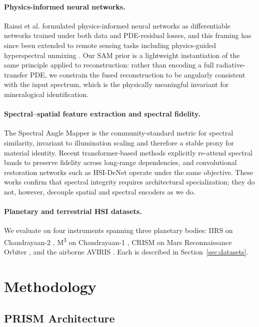 \documentclass{article} %
\begin{document}
\paragraph{Physics-informed neural networks.} Raissi et al. \citep{raissi2019pinn} formulated physics-informed neural networks as differentiable networks trained under both data and PDE-residual losses, and this framing has since been extended to remote sensing tasks including physics-guided hyperspectral unmixing \citep{lin2026hapke}. Our SAM prior is a lightweight instantiation of the same principle applied to reconstruction: rather than encoding a full radiative-transfer PDE, we constrain the fused reconstruction to be angularly consistent with the input spectrum, which is the physically meaningful invariant for mineralogical identification.

\paragraph{Spectral--spatial feature extraction and spectral fidelity.} The Spectral Angle Mapper \citep{kruse1993sips} is the community-standard metric for spectral similarity, invariant to illumination scaling and therefore a stable proxy for material identity. Recent transformer-based methods \citep{hong2022spectralformer, fu2024sst} explicitly re-attend spectral bands to preserve fidelity across long-range dependencies, and convolutional restoration networks such as HSI-DeNet \citep{chang2019hsidenet} operate under the same objective. These works confirm that spectral integrity requires architectural specialization; they do not, however, decouple spatial and spectral encoders as we do.

\paragraph{Planetary and terrestrial HSI datasets.} We evaluate on four instruments spanning three planetary bodies: IIRS on Chandrayaan-2 \citep{chowdhury2020iirs}, M\textsuperscript{3} on Chandrayaan-1 \citep{pieters2009m3}, CRISM on Mars Reconnaissance Orbiter \citep{murchie2007crism}, and the airborne AVIRIS \citep{green1998aviris}. Each is described in Section~\ref{sec:datasets}.

\section{Methodology}

\subsection{PRISM Architecture}
\end{document}
